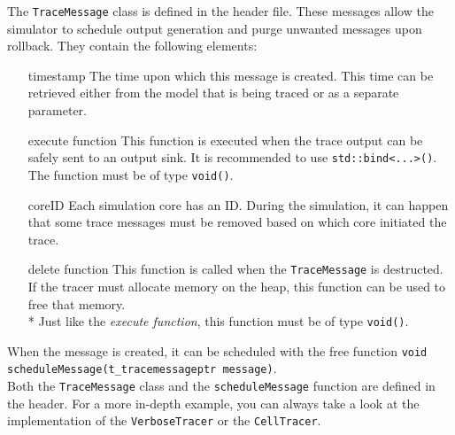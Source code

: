 The \lstinline{TraceMessage} class is defined in the  header file. These messages allow the simulator to schedule output generation and purge unwanted messages upon rollback. They contain the following elements:
\begin{itemize}
	\item[timestamp] The time upon which this message is created. This time can be retrieved either from the model that is being traced or as a separate parameter.
	\item[execute function] This function is executed when the trace output can be safely sent to an output sink. It is recommended to use \lstinline{std::bind<...>()}. The function must be of type \lstinline{void()}.
	\item[coreID] Each simulation core has an ID. During the simulation, it can happen that some trace messages must be removed based on which core initiated the trace.
	\item[delete function] This function is called when the \lstinline{TraceMessage} is destructed. If the tracer must allocate memory on the heap, this function can be used to free that memory.\\*
		Just like the \emph{execute function}, this function must be of type \lstinline{void()}.
\end{itemize}
When the message is created, it can be scheduled with the free function \lstinline{void scheduleMessage(t_tracemessageptr message)}.\\
Both the \lstinline{TraceMessage} class and the \lstinline{scheduleMessage} function are defined in the  header. For a more in-depth example, you can always take a look at the implementation of the \lstinline{VerboseTracer} or the \lstinline{CellTracer}.

